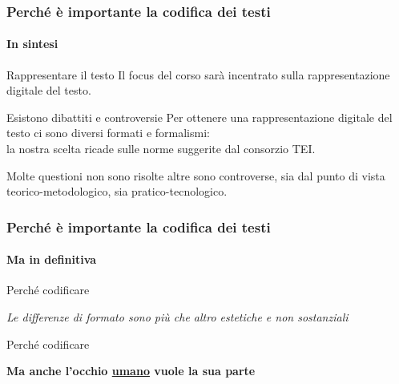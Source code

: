 \begin{frame}
    \frametitle{Perché è importante la codifica dei testi}
    \framesubtitle{In sintesi}
    \addtocounter{nframe}{1}
    
    \begin{block}{Rappresentare il testo}
         Il focus del corso sarà incentrato sulla rappresentazione digitale del testo.
    \end{block}

    \begin{block}{Esistono dibattiti e controversie}
        Per ottenere una rappresentazione digitale del testo ci sono diversi formati e formalismi:
        \\ la nostra scelta ricade sulle norme suggerite dal consorzio TEI.
    
        Molte questioni non sono risolte altre sono controverse, sia dal punto di vista teorico-metodologico, sia pratico-tecnologico.
   
    \end{block}

\end{frame}

\begin{frame}
    \frametitle{Perché è importante la codifica dei testi}
    \framesubtitle{Ma in definitiva}
    \addtocounter{nframe}{1}
    
    \begin{block}{Perché codificare}

        \begin{center}
            \textit{Le differenze di formato sono più che altro estetiche e non sostanziali}
        \end{center}

    \end{block}
     

    \begin{block}{Perché codificare}

        \begin{center}
            \textbf{Ma anche l'occhio \underline{umano} vuole la sua parte}
        \end{center}
       
    \end{block}

\end{frame}

